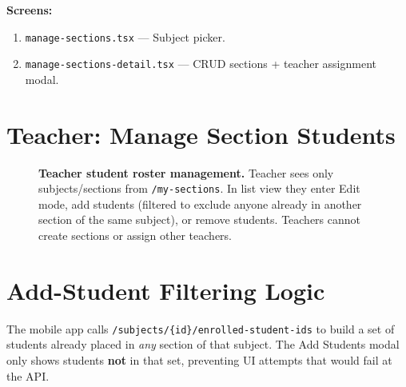 \documentclass[11pt,a4paper,oneside]{report}
\begin{document}
\textbf{Screens:}
\begin{enumerate}[leftmargin=1.5em]
  \item \texttt{manage-sections.tsx} --- Subject picker.
  \item \texttt{manage-sections-detail.tsx} --- CRUD sections + teacher assignment modal.
\end{enumerate}

\section{Teacher: Manage Section Students}

\begin{figure}[H]
  \centering
  \caption{%
    \textbf{Teacher student roster management.}%
    Teacher sees only subjects/sections from \texttt{/my-sections}. In list view they enter Edit mode, add students (filtered to exclude anyone already in another section of the same subject), or remove students. Teachers cannot create sections or assign other teachers.
  }
  \label{fig:teacher-flow}
\end{figure}

\section{Add-Student Filtering Logic}

The mobile app calls \texttt{/subjects/\{id\}/enrolled-student-ids} to build a set of students already placed in \emph{any} section of that subject. The Add Students modal only shows students \textbf{not} in that set, preventing UI attempts that would fail at the API.
\end{document}
